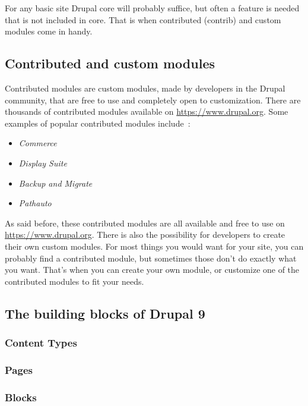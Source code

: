 For any basic site Drupal core will probably suffice, but often a feature is needed that is not included in core. That is when contributed (contrib) and custom modules come in handy.


\subsection{Contributed and custom modules}

Contributed modules are custom modules, made by developers in the Drupal community, that are free to use and completely open to customization. There are thousands of contributed modules available on \url{https://www.drupal.org}. Some examples of popular contributed modules include~\autocite{Tomlinson2015}: 

\begin{itemize}
	\item  \emph{Commerce}
	\item  \emph{Display Suite}
	\item  \emph{Backup and Migrate}
	\item  \emph{Pathauto}
\end{itemize}

As said before, these contributed modules are all available and free to use on \url{https://www.drupal.org}. There is also the possibility for developers to create their own custom modules. For most things you would want for your site, you can probably find a contributed module, but sometimes those don't do exactly what you want. That's when you can create your own module, or customize one of the contributed modules to fit your needs.


\subsection{The building blocks of Drupal 9}

\subsubsection{Content Types}

\subsubsection{Pages}

\subsubsection{Blocks}
\label{sss:blocks}

